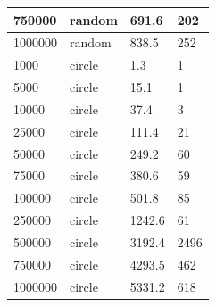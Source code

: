 \documentclass[12pt]{article}
\begin{document}
\begin{table}[h!]
\begin{tabular}{|l|l|l|l|}
750000  & random & 691.6                     & 202               \\ \hline
1000000 & random & 838.5                     & 252               \\ \hline
1000    & circle & 1.3                       & 1                 \\ \hline
5000    & circle & 15.1                      & 1                 \\ \hline
10000   & circle & 37.4                      & 3                 \\ \hline
25000   & circle & 111.4                     & 21                \\ \hline
50000   & circle & 249.2                     & 60                \\ \hline
75000   & circle & 380.6                     & 59                \\ \hline
100000  & circle & 501.8                     & 85                \\ \hline
250000  & circle & 1242.6                    & 61                \\ \hline
500000  & circle & 3192.4                    & 2496              \\ \hline
750000  & circle & 4293.5                    & 462               \\ \hline
1000000 & circle & 5331.2                    & 618               \\ \hline
\end{tabular}
\end{table}
\end{document}
